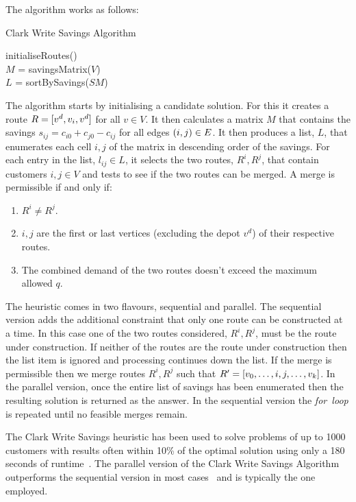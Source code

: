 The algorithm works as follows:

\begin{algorithm}[H]
   \caption{Clark Write Savings Algorithm}
   initialiseRoutes()\\
   $M$ = savingsMatrix($V$)\\
   $L$ = sortBySavings($SM$)\\
\end{algorithm}

The algorithm starts by initialising a candidate solution. For this it creates a route $R = [v^d, v_i, v^d]$ for all $v \in V$. It then calculates a matrix $M$ that contains the savings $s_{ij} = c_{i0} + c_{j0} - c_{ij}$ for all edges $(i,j) \in E$. It then produces a list, $L$, that enumerates each cell $i,j$ of the matrix in descending order of the savings. For each entry in the list, $l_{ij} \in L$, it selects the two routes, $R^i, R^j$, that contain customers $i,j \in V$ and tests to see if the two routes can be merged. A merge is permissible if and only if:

\begin{enumerate}
   \item $R^i \neq R^j$.
   \item $i,j$ are the first or last vertices (excluding the depot $v^d$) of their respective routes.
   \item The combined demand of the two routes doesn't exceed the maximum allowed $q$.
\end{enumerate}

The heuristic comes in two flavours, sequential and parallel. The sequential version adds the additional constraint that only one route can be constructed at a time. In this case one of the two routes considered, $R^i, R^j$, must be the route under construction. If neither of the routes are the route under construction then the list item is ignored and processing continues down the list. If the merge is permissible then we merge routes $R^i, R^j$ such that $R' = [v_0,\ldots,i,j,\ldots,v_k]$. In the parallel version, once the entire list of savings has been enumerated then the resulting solution is returned as the answer. In the sequential version the \emph{for~loop} is repeated until no feasible merges remain.

The Clark Write Savings heuristic has been used to solve problems of up to 1000 customers with results often within 10\% of the optimal solution using only a 180 seconds of runtime~\cite{TV2001}. The parallel version of the Clark Write Savings Algorithm outperforms the sequential version in most cases~\cite{Laporte:1999} and is typically the one employed.

